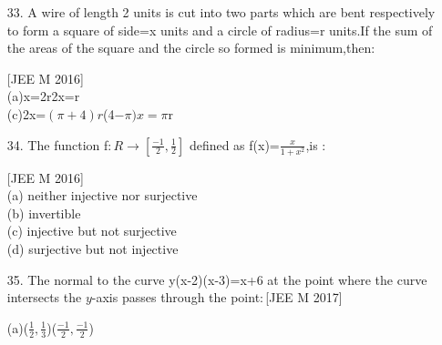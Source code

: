\documentclass[journal,12pt,twocolumn]{IEEEtran}
\theoremstyle{remark}
\begin{document}
\begin{enumerate}
\hfill[JEE M 2016]\\
{(a)}($\frac{\pi}{6},0$)\hspace{0.5cm} {(b)}($\frac{\pi}{4},0$)\hspace{0.5cm}{(c)}(0,0)\hspace{0.5cm}{(d)}($0,\frac{2\pi}{3}$)\\
\item[33.] A wire of length 2 units is cut into two parts which are bent respectively to form a square of side=x units and a circle of radius=r units.If the sum of the areas of the square and the circle so formed is minimum,then$:$

\hfill[JEE M 2016]\\
{(a)}x=2r\hspace{2cm}{(b)}2x=r   \\
{(c)}2x=$(\pi+4)r$\hspace{1cm}{(d)}(4$-\pi)x=\pi$r\\
\item[34.]The function f$: R\rightarrow{[\frac{-1}{2},\frac{1}{2}]}$ defined as f(x)=$\frac{x}{1+x^2}$,is $:$

\hfill[JEE M 2016]\\
{(a)} neither injective nor surjective\\
{(b)} invertible\\
{(c)} injective but not surjective\\
{(d)} surjective but not injective\\
\item[35.] The normal to the curve y(x-2)(x-3)=x+6 at the point where the curve intersects the $y$-axis passes through the point$:$\hfill[JEE M 2017]

{(a)}($\frac{1}{2},\frac{1}{3}$)\hspace{2cm}{(b)}($\frac{-1}{2},\frac{-1}{2}$)\\


\end{enumerate}
\end{document}
